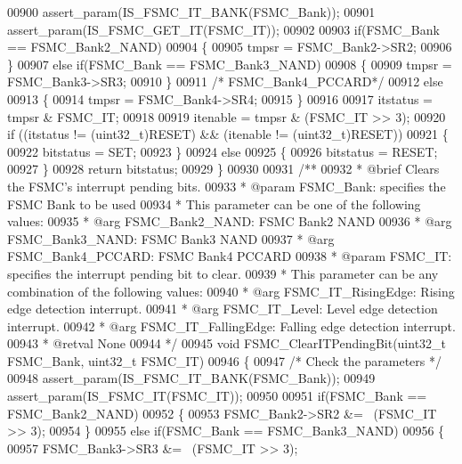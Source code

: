 \begin{DoxyCode}
00900   assert_param(IS\_FSMC\_IT\_BANK(FSMC\_Bank));
00901   assert_param(IS\_FSMC\_GET\_IT(FSMC\_IT));
00902 
00903   \textcolor{keywordflow}{if}(FSMC\_Bank == FSMC_Bank2_NAND)
00904   \{
00905     tmpsr = FSMC_Bank2->SR2;
00906   \}
00907   \textcolor{keywordflow}{else} \textcolor{keywordflow}{if}(FSMC\_Bank == FSMC_Bank3_NAND)
00908   \{
00909     tmpsr = FSMC_Bank3->SR3;
00910   \}
00911   \textcolor{comment}{/* FSMC\_Bank4\_PCCARD*/}
00912   \textcolor{keywordflow}{else}
00913   \{
00914     tmpsr = FSMC_Bank4->SR4;
00915   \}
00916 
00917   itstatus = tmpsr & FSMC\_IT;
00918 
00919   itenable = tmpsr & (FSMC\_IT >> 3);
00920   \textcolor{keywordflow}{if} ((itstatus != (uint32\_t)RESET)  && (itenable != (uint32\_t)RESET))
00921   \{
00922     bitstatus = SET;
00923   \}
00924   \textcolor{keywordflow}{else}
00925   \{
00926     bitstatus = RESET;
00927   \}
00928   \textcolor{keywordflow}{return} bitstatus;
00929 \}
00930 
00931 \textcolor{comment}{/**}
00932 \textcolor{comment}{  * @brief  Clears the FSMC's interrupt pending bits.}
00933 \textcolor{comment}{  * @param  FSMC\_Bank: specifies the FSMC Bank to be used}
00934 \textcolor{comment}{  *          This parameter can be one of the following values:}
00935 \textcolor{comment}{  *            @arg FSMC\_Bank2\_NAND: FSMC Bank2 NAND }
00936 \textcolor{comment}{  *            @arg FSMC\_Bank3\_NAND: FSMC Bank3 NAND}
00937 \textcolor{comment}{  *            @arg FSMC\_Bank4\_PCCARD: FSMC Bank4 PCCARD}
00938 \textcolor{comment}{  * @param  FSMC\_IT: specifies the interrupt pending bit to clear.}
00939 \textcolor{comment}{  *          This parameter can be any combination of the following values:}
00940 \textcolor{comment}{  *            @arg FSMC\_IT\_RisingEdge: Rising edge detection interrupt. }
00941 \textcolor{comment}{  *            @arg FSMC\_IT\_Level: Level edge detection interrupt.}
00942 \textcolor{comment}{  *            @arg FSMC\_IT\_FallingEdge: Falling edge detection interrupt.}
00943 \textcolor{comment}{  * @retval None}
00944 \textcolor{comment}{  */}
00945 \textcolor{keywordtype}{void} FSMC_ClearITPendingBit(uint32\_t FSMC\_Bank, uint32\_t FSMC\_IT)
00946 \{
00947   \textcolor{comment}{/* Check the parameters */}
00948   assert_param(IS\_FSMC\_IT\_BANK(FSMC\_Bank));
00949   assert_param(IS\_FSMC\_IT(FSMC\_IT));
00950 
00951   \textcolor{keywordflow}{if}(FSMC\_Bank == FSMC_Bank2_NAND)
00952   \{
00953     FSMC_Bank2->SR2 &= ~(FSMC\_IT >> 3);
00954   \}
00955   \textcolor{keywordflow}{else} \textcolor{keywordflow}{if}(FSMC\_Bank == FSMC_Bank3_NAND)
00956   \{
00957     FSMC_Bank3->SR3 &= ~(FSMC\_IT >> 3);

\end{DoxyCode}
